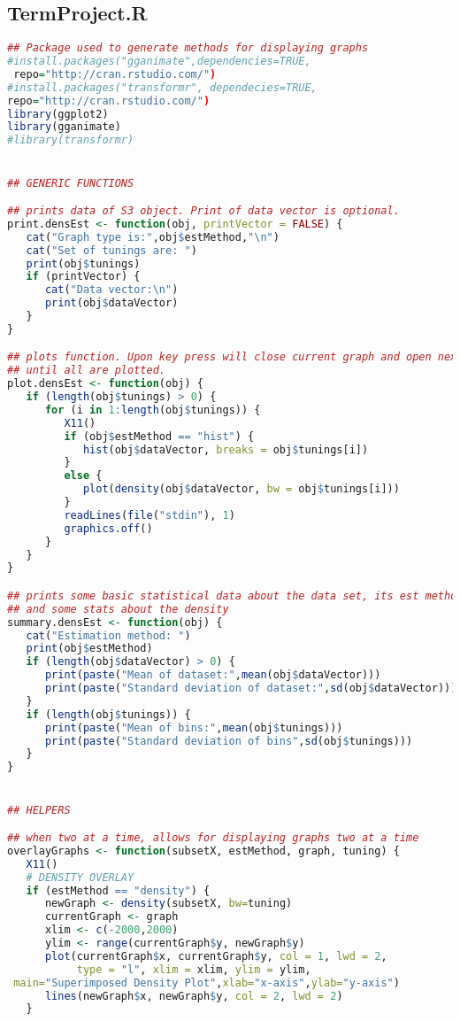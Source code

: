 \documentclass{article}
\begin{document}
\subsection*{TermProject.R}
\begin{lstlisting}[frame=single,language=R,showstringspaces=false]
## Package used to generate methods for displaying graphs
#install.packages("gganimate",dependencies=TRUE,
 repo="http://cran.rstudio.com/")
#install.packages("transformr", dependecies=TRUE, 
repo="http://cran.rstudio.com/")
library(ggplot2)
library(gganimate)
#library(transformr)


## GENERIC FUNCTIONS

## prints data of S3 object. Print of data vector is optional.
print.densEst <- function(obj, printVector = FALSE) {
   cat("Graph type is:",obj$estMethod,"\n")
   cat("Set of tunings are: ")
   print(obj$tunings)
   if (printVector) {
      cat("Data vector:\n")
      print(obj$dataVector)
   }
}

## plots function. Upon key press will close current graph and open next one
## until all are plotted.
plot.densEst <- function(obj) {
   if (length(obj$tunings) > 0) {
      for (i in 1:length(obj$tunings)) {
         X11()
         if (obj$estMethod == "hist") {
            hist(obj$dataVector, breaks = obj$tunings[i])
         }
         else {
            plot(density(obj$dataVector, bw = obj$tunings[i]))
         }
         readLines(file("stdin"), 1)
         graphics.off()
      }
   }
}

## prints some basic statistical data about the data set, its est method
## and some stats about the density
summary.densEst <- function(obj) {
   cat("Estimation method: ")
   print(obj$estMethod)
   if (length(obj$dataVector) > 0) {
      print(paste("Mean of dataset:",mean(obj$dataVector)))
      print(paste("Standard deviation of dataset:",sd(obj$dataVector)))
   }
   if (length(obj$tunings)) {
      print(paste("Mean of bins:",mean(obj$tunings)))
      print(paste("Standard deviation of bins",sd(obj$tunings)))
   }
}


## HELPERS

## when two at a time, allows for displaying graphs two at a time
overlayGraphs <- function(subsetX, estMethod, graph, tuning) {
   X11()
   # DENSITY OVERLAY
   if (estMethod == "density") {
      newGraph <- density(subsetX, bw=tuning)
      currentGraph <- graph
      xlim <- c(-2000,2000)
      ylim <- range(currentGraph$y, newGraph$y)
      plot(currentGraph$x, currentGraph$y, col = 1, lwd = 2,
           type = "l", xlim = xlim, ylim = ylim,
 main="Superimposed Density Plot",xlab="x-axis",ylab="y-axis")
      lines(newGraph$x, newGraph$y, col = 2, lwd = 2)
   }
     

\end{lstlisting}
\end{document}
